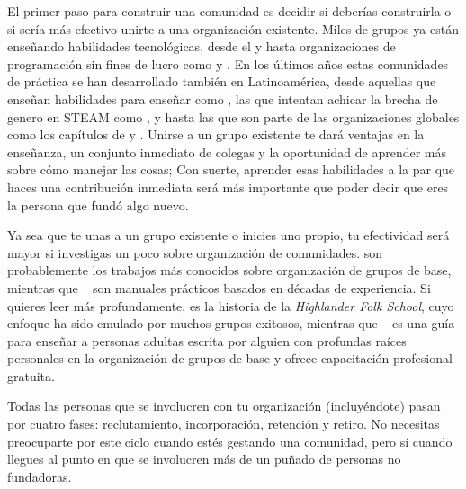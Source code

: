 El primer paso para construir una comunidad es decidir si deberías construirla
o si sería más efectivo unirte a una organización existente.
Miles de grupos ya están enseñando habilidades tecnológicas,
desde el 
y 
hasta organizaciones de programación sin fines de lucro como
y .
En los últimos años estas comunidades de práctica se han desarrollado también en Latinoamérica, 
desde aquellas que enseñan habilidades para enseñar como , 
las que intentan achicar la brecha de genero en STEAM como , 
 y  
hasta las que son parte de las organizaciones globales como los capítulos de  y 
.
Unirse a un grupo existente te dará ventajas en la enseñanza,
un conjunto inmediato de colegas
y la oportunidad de aprender más sobre cómo manejar las cosas;
Con suerte,
aprender esas habilidades a la par que haces una contribución inmediata
será más importante que poder decir que
eres la persona que fundó algo nuevo.

Ya sea que te unas a un grupo existente o inicies uno propio,
tu efectividad será mayor si investigas un poco sobre organización de comunidades.
\cite{Alin1989,Lake2018} son probablemente los trabajos más conocidos sobre organización de grupos de base,
mientras que ~\cite{Brow2007,Midw2010,Lake2018} son manuales prácticos basados en décadas de experiencia.
Si quieres leer más profundamente,
\cite{Adam1975} es la historia de la \emph{Highlander Folk School},
cuyo enfoque ha sido emulado por muchos grupos exitosos,
mientras que ~\cite{Spal2014} es una guía para enseñar a personas adultas
escrita por alguien con profundas raíces personales en la organización de grupos de base
y 
ofrece capacitación profesional gratuita.


Todas las personas que se involucren con tu organización
(incluyéndote)
pasan por cuatro fases:
reclutamiento, incorporación, retención y retiro.
No necesitas preocuparte por este ciclo cuando estés gestando una comunidad,
pero sí cuando llegues al punto en que se involucren más de un puñado de personas no fundadoras.

